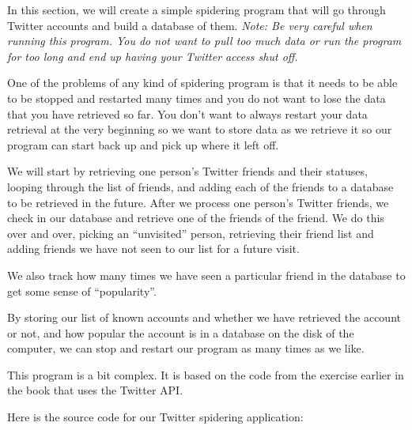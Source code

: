 \documentclass[10pt]{book}
\begin{document}
In this section, we will create a simple spidering program that will 
go through Twitter accounts and build a database of them.
\emph{Note: Be very careful when running this program.  You do not
want to pull too much data or run the program for too long and
end up having your Twitter access shut off.}

One of the problems of any kind of spidering program is that it 
needs to be able to be stopped and restarted many times and 
you do not want to lose the data that you have retrieved so far.
You don't want to always restart your data retrieval at the
very beginning so we want to store data as we retrieve it so our
program can start back up and pick up where it left off.

We will start by retrieving one person's Twitter friends and their
statuses, looping through the list of friends, and adding each 
of the friends to a database to be retrieved in the future.  After
we process one person's Twitter friends, we check in our database
and retrieve one of the friends of the friend.  We do this over and
over, picking an ``unvisited'' person, retrieving their friend list
and adding friends we have not seen to our list for a future visit.

We also track how many times we have seen a particular friend in the
database to get some sense of ``popularity''.

By storing our list of known accounts and whether 
we have retrieved the account or not, 
and how popular the account is in a database on the disk
of the computer, we can stop and
restart our program as many times as we like.

This program is a bit complex. It is based on the code 
from the exercise earlier in the book that uses
the Twitter API.

Here is the source code for our Twitter spidering application:
\end{document}
